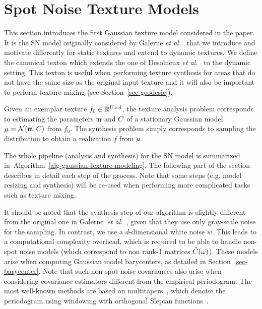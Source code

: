 
\section{Spot Noise Texture Models}
\label{sec-sn}

This section introduces the first Gaussian texture model considered in the paper. It is the SN model originally considered by Galerne \emph{et al.}~\cite{galerne-ieee} that we introduce and motivate differently for static textures and extend to dynamic textures. We define the canonical texton which extends the one of Desolneux \emph{et al.}~\cite{Desolneux-Moisan-12,Desolneux-texton} to the dynamic setting. This texton is useful when performing texture synthesis for areas that do not have the same size as the original input texture and it will also be important to perform texture mixing (see Section~\ref{sec-geodesic}).

Given an exemplar texture $f_0 \in \mathbb{R}^{U \times d}$, the texture analysis problem corresponds to estimating the  parameters ${\frak m}$ and $C$ of a stationary Gaussian model $\mu = \mathcal{N}({\frak m}, C)$ from $f_0$. The synthesis problem simply corresponds to sampling the distribution to obtain a realization $f$ from $\mu$.

The whole pipeline (analysis and synthesis) for the SN model is summarized in~Algorithm~\ref{alg-gaussian-texture-modeling}. The following part of the section describes in detail each step of the process. Note that some steps (e.g. model resizing and synthesis) will be re-used when performing more complicated tasks such as texture mixing.

It should be noted that the synthesis step of our algorithm is slightly different from the original one in Galerne~\emph{et al.}~\cite{galerne-ieee}, given that they use only gray-scale noise for the sampling. In contrast, we use a $d$-dimensional white noise $w$. This leads to a computational complexity overhead, which is required to be able to handle non-spot noise models (which correspond to non rank-1 matrices $\hat{C}(\omega)$). These models arise  when computing Gaussian model barycenters, as detailed in Section~\ref{sec-barycenter}. Note that such non-spot noise covariances also arise when considering covariance estimators different from the empirical periodogram. The most well-known methods are based on multitapers~\cite{Percival-Book}, which denoise the periodogram using windowing with orthogonal Slepian functions~\cite{Slepian-Prolate}.


